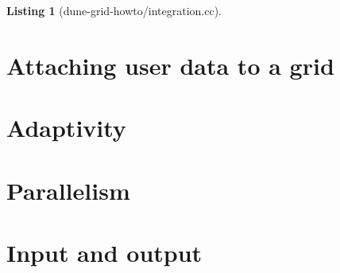 \documentclass[11pt,a4paper,headinclude,footinclude,DIV14,BCOR8.25mm,titlepage,twoside,openright,normalheadings]{scrreprt}
\newtheorem{lst}{Listing}
\begin{document}
\begin{lst}[dune-grid-howto/integration.cc] \mbox{}


\end{lst}


\chapter{Attaching user data to a grid}

\chapter{Adaptivity}

\chapter{Parallelism}

\chapter{Input and output}








\printindex
\end{document}
